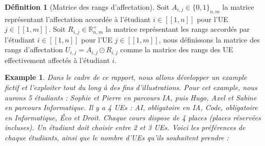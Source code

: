 \documentclass{rapport}
\theoremstyle{definition}
\newtheorem{definition}{Définition}
\theoremstyle{remark}
\theoremstyle{plain}
\newtheorem{example}{Example}
\theoremstyle{definition}
\theoremstyle{remark}
\newcommand{\llbracket}{[\![}
\newcommand{\rrbracket}{]\!]}
\begin{document}
\begin{definition}[Matrice des rangs d'affectation]
    Soit $A_{i,j}\in\{0,1\}_{n,m}$ la matrice représentant l'affectation accordée à l'étudiant $i\in\llbracket 1,n\rrbracket$ pour l'UE $j\in\llbracket 1,m\rrbracket$. 
    Soit $R_{i,j}\in\mathbb{R}^{+}_{n,m}$ la matrice représentant les rangs accordés par l'étudiant $i\in\llbracket 1,n\rrbracket$ pour l'UE $j\in\llbracket 1,m\rrbracket$, nous
    définissons la matrice des rangs d'affectation $U_{i,j} = A_{i,j} \odot R_{i,j}$ comme la matrice des rangs des UE effectivement affectés à l'étudiant $i$.
\end{definition}

\begin{example}\label{ex:running1}
    Dans le cadre de ce rapport, nous allons développer un example fictif et l'exploiter tout du long à des fins d'illustrations.
    Pour cet example, nous aurons 5 étudiants : Sophie et Pierre en parcours IA, puis Hugo, Axel et Sabine en parcours Informatique.
    Il y a 4 UEs : AI, obligatoire en IA, Code, obligatoire en Informatique, Éco et Droit. Chaque cours dispose de 4 places (places réservées incluses). 
    Un étudiant doit choisir entre 2 et 3 UEs. Voici les préférences de chaque étudiants, ainsi que le nombre d'UEs qu'ils souhaitent prendre :
    

\end{example}
\end{document}

